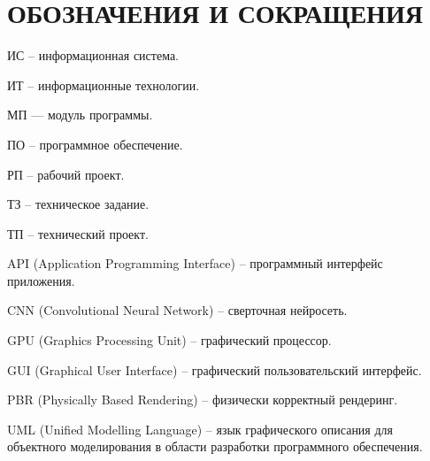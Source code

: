 \section*{ОБОЗНАЧЕНИЯ И СОКРАЩЕНИЯ}

ИС -- информационная система.

ИТ -- информационные технологии. 

МП — модуль программы.

ПО -- программное обеспечение.

РП -- рабочий проект.

ТЗ -- техническое задание.

ТП -- технический проект.

API (Application Programming Interface) -- программный интерфейс приложения.

CNN (Convolutional Neural Network) -- сверточная нейросеть.

GPU (Graphics Processing Unit) -- графический процессор.

GUI (Graphical User Interface) -- графический пользовательский интерфейс.

PBR (Physically Based Rendering) -- физически корректный рендеринг.

UML (Unified Modelling Language) -- язык графического описания для объектного моделирования в области разработки программного обеспечения.




